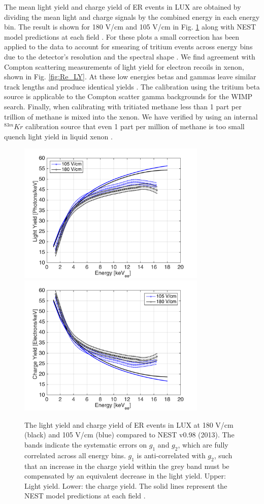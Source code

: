 The mean light yield and charge yield of ER events in LUX are obtained by dividing the mean light and charge signals by the combined energy in each energy bin. The result is shown for 180 V/cm and 105 V/cm in Fig. \ref{fig:ER-LY-QY} along with NEST model predictions at each field \cite{NEST_2013}. For these plots a small correction has been applied to the data to account for smearing of tritium events across energy bins due to the detector's resolution and the spectral shape \cite{Dobi_Thesis}. We find agreement with Compton scattering measurements of light yield for electron recoils in xenon, shown in Fig. \ref{fig:Re_LY}. At these low energies betas and gammas leave similar track lengths and produce identical yields \cite{NEST_2013}. The calibration using the tritium beta source is applicable to the Compton scatter gamma backgrounds for the WIMP search. Finally, when calibrating with tritiated methane less than 1 part per trillion of methane is mixed into the xenon. We have verified by using an internal $^{83m}Kr$ calibration source that even 1 part per million of methane is too small quench light yield in liquid xenon \cite{Dobi_Thesis}.

\begin{figure}[h!]\centering
\includegraphics[width=90mm]{fig/ER_LY.png}
\includegraphics[width=90mm]{fig/ER_QY.png}
\caption{The light yield and charge yield of ER events in LUX at 180 V/cm (black) and 105 V/cm (blue) compared to NEST v0.98 (2013). The bands indicate the systematic errors on $g_1$ and $g_2$, which are fully correlated across all energy bins. $g_1$ is anti-correlated with $g_2$, such that an increase in the charge yield within the grey band must be compensated by an equivalent decrease in the light yield. Upper: Light yield. Lower: the charge yield. The solid lines represent the NEST model predictions at each field \cite{NEST_2013}.}
\label{fig:ER-LY-QY}
\end{figure}

